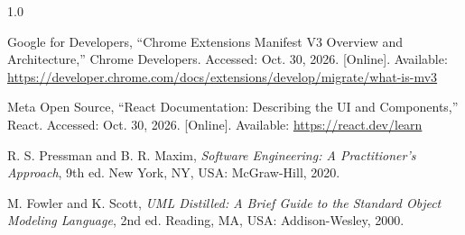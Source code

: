 \documentclass[12pt,a4paper,twoside]{report}
\begin{document}
\begin{spacing}{1.0}
\begin{enumerate}[label={[\arabic*]},leftmargin=0.9cm,itemsep=5pt,topsep=2pt]
  \item Google for Developers, ``Chrome Extensions Manifest V3 Overview and Architecture,'' Chrome Developers. Accessed: Oct. 30, 2026. [Online]. Available: \url{https://developer.chrome.com/docs/extensions/develop/migrate/what-is-mv3}

  \item Meta Open Source, ``React Documentation: Describing the UI and Components,'' React. Accessed: Oct. 30, 2026. [Online]. Available: \url{https://react.dev/learn}

  \item R. S. Pressman and B. R. Maxim, \textit{Software Engineering: A Practitioner's Approach}, 9th ed. New York, NY, USA: McGraw-Hill, 2020.

  \item M. Fowler and K. Scott, \textit{UML Distilled: A Brief Guide to the Standard Object Modeling Language}, 2nd ed. Reading, MA, USA: Addison-Wesley, 2000.
\end{enumerate}
\end{spacing}
\endgroup
\end{document}
